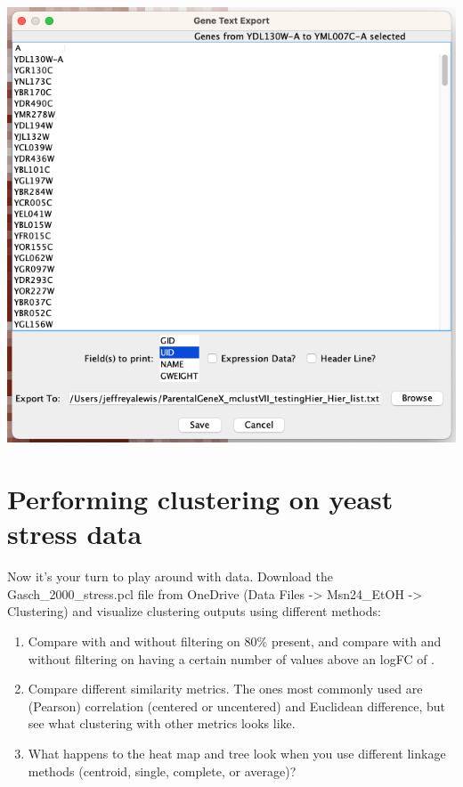 \documentclass[
]{book}
\begin{document}
\includegraphics[width=9.03in]{figures/Exported_Gene_List}

\hypertarget{performing-clustering-on-yeast-stress-data}{%
\section{Performing clustering on yeast stress data}\label{performing-clustering-on-yeast-stress-data}}

Now it's your turn to play around with data. Download the Gasch\_2000\_stress.pcl file from OneDrive (Data Files -\textgreater{} Msn24\_EtOH -\textgreater{} Clustering) and visualize clustering outputs using different methods:

\begin{enumerate}
\def\labelenumi{\arabic{enumi})}
\item
  Compare with and without filtering on 80\% present, and compare with and without filtering on having a certain number of values above an logFC of \textbar.
\item
  Compare different similarity metrics. The ones most commonly used are (Pearson) correlation (centered or uncentered) and Euclidean difference, but see what clustering with other metrics looks like.
\item
  What happens to the heat map and tree look when you use different linkage methods (centroid, single, complete, or average)?
\end{enumerate}
\end{document}
